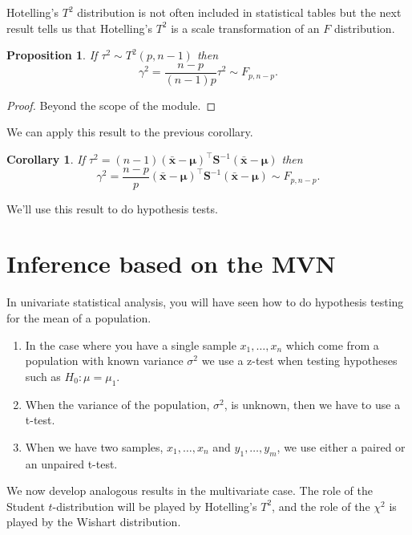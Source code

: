 \documentclass[
]{book}
\newtheorem{corollary}{Corollary}[chapter]
\newtheorem{proposition}{Proposition}[chapter]
\theoremstyle{definition}
\theoremstyle{definition}
\theoremstyle{definition}
\theoremstyle{definition}
\theoremstyle{remark}
\begin{document}
Hotelling's \(T^2\) distribution is not often included in statistical tables but the next result tells us that Hotelling's \(T^2\) is a scale transformation of an \(F\) distribution.

\begin{proposition}
\protect\hypertarget{prp:six14}{}\label{prp:six14}If \(\tau^2 \sim T^2(p,n-1)\) then
\[\gamma^2 = \frac{n-p}{(n-1)p} \tau^2 \sim F_{p,n-p}.\]
\end{proposition}

\begin{proof}
Beyond the scope of the module.
\end{proof}

We can apply this result to the previous corollary.

\begin{corollary}
\protect\hypertarget{cor:csix6}{}\label{cor:csix6}If \(\tau^2 = (n-1)(\bar{\mathbf x}-{\boldsymbol{\mu}})^\top \mathbf S^{-1} (\bar{\mathbf x}-{\boldsymbol{\mu}})\) then
\[ \gamma^2 = \frac{n-p}{p} (\bar{\mathbf x}-{\boldsymbol{\mu}})^\top \mathbf S^{-1} (\bar{\mathbf x}-{\boldsymbol{\mu}}) \sim F_{p,n-p}. \]
\end{corollary}

We'll use this result to do hypothesis tests.

\section{Inference based on the MVN}\label{inference-based-on-the-mvn}

In univariate statistical analysis, you will have seen how to do hypothesis testing for the mean of a population.

\begin{enumerate}
\def\labelenumi{\arabic{enumi}.}
\item
  In the case where you have a single sample \(x_1, \ldots, x_n\) which come from a population with known variance \(\sigma^2\) we use a z-test when testing hypotheses such as
  \(H_0: \mu=\mu_1\).
\item
  When the variance of the population, \(\sigma^2\), is unknown, then we have to use a t-test.
\item
  When we have two samples, \(x_1, \ldots, x_n\) and \(y_1, \ldots, y_m\), we use either a paired or an unpaired t-test.
\end{enumerate}

We now develop analogous results in the multivariate case. The role of the Student \(t\)-distribution will be played by Hotelling's \(T^2\), and the role of the \(\chi^2\) is played by the Wishart distribution.
\end{document}
